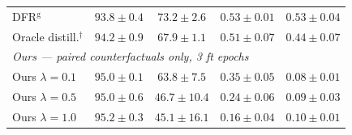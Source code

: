 \documentclass{article}
\begin{document}
\begin{table}[t]
\begin{tabular}{lcccc}
DFR$^{\mathrm{g}}$~\cite{kirichenko2023last} & $93.8 \pm 0.4$ & $73.2 \pm 2.6$ & $0.53 \pm 0.01$ & $0.53 \pm 0.04$ \\
Oracle distill.$^{\dagger}$          & $94.2 \pm 0.9$ & $67.9 \pm 1.1$ & $0.51 \pm 0.07$ & $0.44 \pm 0.07$ \\
\midrule
\multicolumn{5}{l}{\textit{Ours --- paired counterfactuals only, 3 ft epochs}} \\
Ours $\lambda{=}0.1$                 & $95.0 \pm 0.1$ & $63.8 \pm 7.5$ & $0.35 \pm 0.05$ & $\mathbf{0.08 \pm 0.01}$ \\
Ours $\lambda{=}0.5$                 & $95.0 \pm 0.6$ & $46.7 \pm 10.4$ & $0.24 \pm 0.06$ & $0.09 \pm 0.03$ \\
Ours $\lambda{=}1.0$                 & $95.2 \pm 0.3$ & $45.1 \pm 16.1$ & $\mathbf{0.16 \pm 0.04}$ & $0.10 \pm 0.01$ \\
\bottomrule
\end{tabular}
\end{table}
\end{document}

